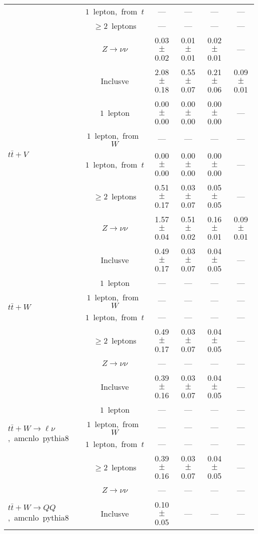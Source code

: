 \documentclass{article}
\begin{document}
\begin{longtable}{|l|c|c|c|c|c|}
 & $1$~lepton,~from~$t$  & ---  & ---  & ---  & --- \\* 
 & $\ge2$~leptons  & ---  & ---  & ---  & --- \\* 
 & $Z\rightarrow\nu\nu$  & 0.03 $\pm$ 0.02  & 0.01 $\pm$ 0.01  & 0.02 $\pm$ 0.01  & --- \\* 
\hline 
\multirow{6}{*}{$t\bar{t}+V$} & Inclusve  & 2.08 $\pm$ 0.18  & 0.55 $\pm$ 0.07  & 0.21 $\pm$ 0.06  & 0.09 $\pm$ 0.01 \\* 
 & $1$~lepton  & 0.00 $\pm$ 0.00  & 0.00 $\pm$ 0.00  & 0.00 $\pm$ 0.00  & --- \\* 
 & $1$~lepton,~from~$W$  & ---  & ---  & ---  & --- \\* 
 & $1$~lepton,~from~$t$  & 0.00 $\pm$ 0.00  & 0.00 $\pm$ 0.00  & 0.00 $\pm$ 0.00  & --- \\* 
 & $\ge2$~leptons  & 0.51 $\pm$ 0.17  & 0.03 $\pm$ 0.07  & 0.05 $\pm$ 0.05  & --- \\* 
 & $Z\rightarrow\nu\nu$  & 1.57 $\pm$ 0.04  & 0.51 $\pm$ 0.02  & 0.16 $\pm$ 0.01  & 0.09 $\pm$ 0.01 \\* 
\hline 
\multirow{6}{*}{$t\bar{t}+W$} & Inclusve  & 0.49 $\pm$ 0.17  & 0.03 $\pm$ 0.07  & 0.04 $\pm$ 0.05  & --- \\* 
 & $1$~lepton  & ---  & ---  & ---  & --- \\* 
 & $1$~lepton,~from~$W$  & ---  & ---  & ---  & --- \\* 
 & $1$~lepton,~from~$t$  & ---  & ---  & ---  & --- \\* 
 & $\ge2$~leptons  & 0.49 $\pm$ 0.17  & 0.03 $\pm$ 0.07  & 0.04 $\pm$ 0.05  & --- \\* 
 & $Z\rightarrow\nu\nu$  & ---  & ---  & ---  & --- \\* 
\hline 
\multirow{6}{*}{$t\bar{t}+W{\rightarrow}{\ell}{\nu}$,~amcnlo~pythia8} & Inclusve  & 0.39 $\pm$ 0.16  & 0.03 $\pm$ 0.07  & 0.04 $\pm$ 0.05  & --- \\* 
 & $1$~lepton  & ---  & ---  & ---  & --- \\* 
 & $1$~lepton,~from~$W$  & ---  & ---  & ---  & --- \\* 
 & $1$~lepton,~from~$t$  & ---  & ---  & ---  & --- \\* 
 & $\ge2$~leptons  & 0.39 $\pm$ 0.16  & 0.03 $\pm$ 0.07  & 0.04 $\pm$ 0.05  & --- \\* 
 & $Z\rightarrow\nu\nu$  & ---  & ---  & ---  & --- \\* 
\hline 
\multirow{6}{*}{$t\bar{t}+W{\rightarrow}QQ$,~amcnlo~pythia8} & Inclusve  & 0.10 $\pm$ 0.05  & ---  & ---  & --- \\* 

\end{longtable}
\end{document}
